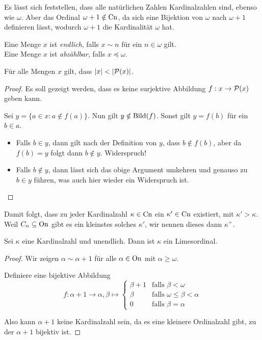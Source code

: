 Es lässt sich feststellen, dass alle natürlichen Zahlen Kardinalzahlen sind, ebenso wie $\omega$. Aber das Ordinal $\omega+1\notin \operatorname{Cn}$, da sich eine Bijektion von $\omega$ nach $\omega+1$ definieren lässt, wodurch $\omega+1$ die Kardinalität $\omega$ hat.

\begin{definition}
	Eine Menge $x$ ist \textit{endlich}, falls $x\sim n$ für ein $n\in \omega$ gilt.
	\\
	Eine Menge $x$ ist \textit{abzählbar}, falls $x\preceq \omega$.
\end{definition}

\begin{satz}[Cantor]
	Für alle Mengen $x$ gilt, dass $\vert x \vert <\vert \mathcal{P}(x)\vert$.
	\label{SatzVonCantor}
\end{satz}
\begin{proof}
	Es soll gezeigt werden, dass es keine surjektive Abbildung $f:x\to\mathcal{P}(x)$ geben kann.
	
	Sei $y=\{a\in x : a\notin f(a)\}$. Nun gilt $y\notin \operatorname{Bild}(f)$. Sonst gilt $y=f(b)$ für ein $b\in a$.
	\begin{itemize}
		\item Falls $b\in y$, dann gilt nach der Definition von $y$, dass $b\notin f(b)$, aber da $f(b)=y$ folgt dann $b\notin y$. Widerspruch!
		\item Falls $b\notin y$, dann lässt sich das obige Argument umkehren und genauso zu $b\in y$ führen, was auch hier wieder ein Widerspruch ist.
	\end{itemize}
\end{proof}

Damit folgt, dass zu jeder Kardinalzahl $\kappa\in \operatorname{Cn}$ ein $\kappa'\in \operatorname{Cn}$ existiert, mit $\kappa'>\kappa$.
\\
Weil $C_n\subseteq \operatorname{On}$ gibt es ein kleinstes solches $\kappa'$, wir nennen dieses dann $\kappa^+$.

\begin{lemma}
	Sei $\kappa$ eine Kardinalzahl und unendlich. Dann ist $\kappa$ ein Limesordinal.
\end{lemma}
\begin{proof}
	Wir zeigen $\alpha\sim \alpha+1$ für alle $\alpha\in \operatorname{On}$ mit $\alpha \geq \omega$.
	
	Definiere eine bijektive Abbildung 
	$$f:\alpha+1\to \alpha, \beta \mapsto
		\begin{cases}
			\beta+1 & \text{falls } \beta <\omega \\
			\beta & \text{falls } \omega \leq \beta < \alpha \\
			0 & \text{falls } \beta=\alpha
		\end{cases}$$
	
	Also kann $\alpha+1$ keine Kardinalzahl sein, da es eine kleinere Ordinalzahl gibt, zu der $\alpha+1$ bijektiv ist.
\end{proof}

